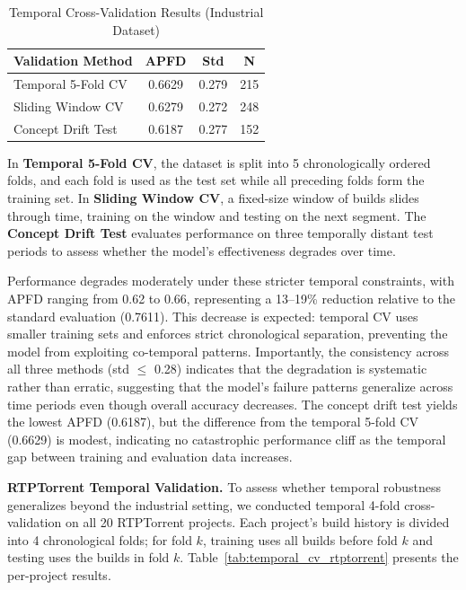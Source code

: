 \begin{table}[!t]
\centering
\caption{Temporal Cross-Validation Results (Industrial Dataset)}
\label{tab:temporal_cv}
\begin{tabular}{lccc}
\toprule
\textbf{Validation Method} & \textbf{APFD} & \textbf{Std} & \textbf{N} \\
\midrule
Temporal 5-Fold CV & 0.6629 & 0.279 & 215 \\
Sliding Window CV & 0.6279 & 0.272 & 248 \\
Concept Drift Test & 0.6187 & 0.277 & 152 \\
\bottomrule
\end{tabular}
\end{table}

In \textbf{Temporal 5-Fold CV}, the dataset is split into 5 chronologically
ordered folds, and each fold is used as the test set while all preceding folds
form the training set. In \textbf{Sliding Window CV}, a fixed-size window of
builds slides through time, training on the window and testing on the next
segment. The \textbf{Concept Drift Test} evaluates performance on three
temporally distant test periods to assess whether the model's effectiveness
degrades over time.

Performance degrades moderately under these stricter temporal constraints,
with APFD ranging from 0.62 to 0.66, representing a 13--19\% reduction relative to the
standard evaluation (0.7611). This decrease is expected: temporal CV uses
smaller training sets and enforces strict chronological separation, preventing
the model from exploiting co-temporal patterns. Importantly, the consistency
across all three methods (std $\leq$ 0.28) indicates that the degradation is
systematic rather than erratic, suggesting that the model's failure patterns
generalize across time periods even though overall accuracy decreases. The
concept drift test yields the lowest APFD (0.6187), but the difference from
the temporal 5-fold CV (0.6629) is modest, indicating no catastrophic
performance cliff as the temporal gap between training and evaluation data
increases.

\textbf{RTPTorrent Temporal Validation.}
To assess whether temporal robustness generalizes beyond the industrial setting,
we conducted temporal 4-fold cross-validation on all 20 RTPTorrent projects.
Each project's build history is divided into 4 chronological folds; for fold
$k$, training uses all builds before fold $k$ and testing uses the builds
in fold $k$. Table~\ref{tab:temporal_cv_rtptorrent} presents the per-project
results.

